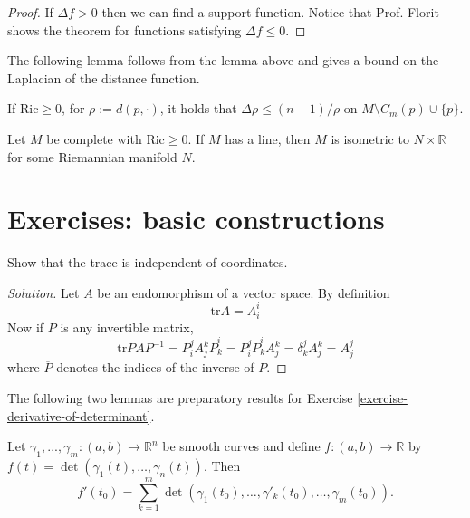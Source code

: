 \begin{proof}
If $\Delta f>0$ then we can find a support
function. Notice that Prof. Florit
shows the theorem for functions satisfying
$\Delta f \leq 0$.
\end{proof}

The following lemma follows from the lemma
above and gives a bound on the
Laplacian of the distance function.

\begin{lemma}[Calabi]
\label{lemma-Calabi}
If $\text{Ric} \geq 0$, for
$\rho:=d(p,\cdot)$, it holds that
$\Delta\rho \leq (n-1)/\rho$ on $M\setminus
C_m(p)\cup\{p\}$.
\end{lemma}


\begin{theorem}
\label{theorem-splitting}
Let $M$ be complete with  $\text{Ric}\geq0$.
If $M$ has a line, then $M$ is
isometric to $N\times\mathbb{R}$ for some
Riemannian manifold $N$.
\end{theorem}

\section{Exercises: basic constructions}
\label{section-exercises-constructions}

\begin{exercise}
\label{exercise-trace-indep-coord}
Show that the trace is independent of
coordinates.
\end{exercise}

\begin{proof}[Solution]
Let $A$ be an endomorphism of a vector space.
By definition
$$
\text{tr}A=A_i^i
$$
Now if $P$ is any invertible matrix,
$$
\text{tr}PAP^{-1}=P^j_iA_j^k\overline{P}_k^i=
P^j_i\overline{P}_k^iA_j^k
=\delta_k^jA_j^k=A_j^j
$$
where $\overline{P}$ denotes the indices of
the inverse of $P$.
\end{proof}

The following two lemmas are preparatory
results for Exercise
\ref{exercise-derivative-of-determinant}.

\begin{lemma}
\label{lemma-for-derivative-of-determinant1}
Let
$\gamma_1,...,\gamma_m:(a,b)\to\mathbb{R}^n$
be smooth curves and define
$f:(a,b)\to\mathbb{R}$ by
$f(t)=\det(\gamma_1(t),\ldots,\gamma_n(t))$.
Then
$$
f'(t_0)
=\sum_{k=1}^{m}\det(\gamma_1(t_0),\ldots,
\gamma'_k(t_0),\ldots,\gamma_m(t_0)).
$$
\end{lemma}

